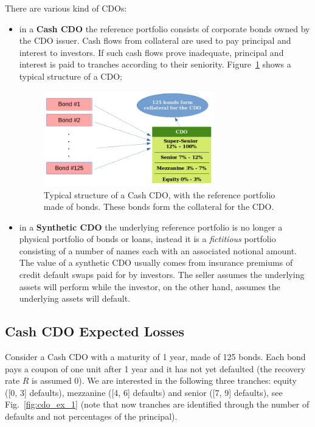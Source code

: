There are various kind of CDOs:
\begin{itemize}
	\item in a \textbf{Cash CDO} the reference portfolio consists of corporate bonds owned by the CDO issuer. Cash flows from collateral are used to pay principal and interest to investors. If such cash flows prove inadequate, principal and interest is paid to tranches according to their seniority. Figure~\ref{fig:cdo_structure} shows a typical structure of a CDO;

\begin{figure}[htb]
	\centering
	\includegraphics[width=0.7\textwidth]{figures/cdo_structure}
	\caption{Typical structure of a Cash CDO, with the reference portfolio made of bonds. These bonds form the collateral for the CDO.}
	\label{fig:cdo_structure}
\end{figure}

	\item in a \textbf{Synthetic CDO} the underlying reference portfolio is no longer a physical portfolio of bonds or loans, instead it is a \emph{fictitious} portfolio consisting of a number of names each with an associated notional amount. The value of a synthetic CDO usually comes from insurance premiums of credit default swaps paid for by investors. The seller assumes the underlying assets will perform while the investor, on the other hand, assumes the underlying assets will default.
\end{itemize}

\subsection{Cash CDO Expected Losses}\label{sec:expected_losses}

Consider a Cash CDO with a maturity of 1 year, made of 125 bonds. Each bond pays a coupon of one unit after 1 year and it has not yet defaulted (the recovery rate $R$ is assumed 0). We are interested in the following three tranches: equity ([0, 3] defaults), mezzanine ([4, 6] defaults) and senior ([7, 9] defaults), see Fig.~\ref{fig:cdo_ex_1} (note that now tranches are identified through the number of defaults and not percentages of the principal). 

